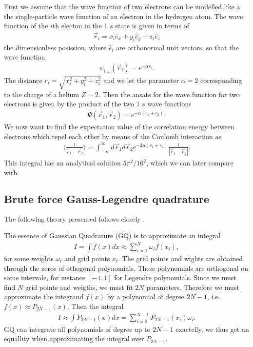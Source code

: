 \documentclass[twocolumn]{aastex62}
\begin{document}
First we assume that the wave function of two electrons can be modelled like a the single-particle wave function of an electron in the hydrogen atom. The wave function of the $i$th electon in the 1 $s$ state is given in terms of
\begin{align}
	\vec{r}_i = x_i \hat{e}_x + y_i\hat{e}_y + z_i\hat{e}_z
\end{align} 
the dimensionless posission, where $\hat{e}_i$ are orthonormal unit vectors, so that the wave function
\begin{align}
	\psi_{1,s}(\vec{r}_i) = e^{-\alpha r_i}.
\end{align}
The distance $r_i = \sqrt{x_i^2 + y_i^2 + z_i^2}$ and we let the parameter $\alpha = 2$ corresponding to the charge of a helium $Z = 2$. Then the ansats for the wave function for two electrons is given by the product of the two 1 $s$ wave functions 
\begin{align}
	\Psi(\vec{r}_1, \vec{r}_2) = e^{-\alpha(r_1 + r_2)}.
\end{align}
We now want to find the expectation value of the correlation energy between electrons which repel each other by means of the Coulomb interaction as 
\begin{align}
\langle \frac{
1}{\vec{r}_1 - \vec{r}_2}\rangle = \int^\infty_{-\infty} d\vec{r}_1d\vec{r}_2 e^{-2\alpha(r_1 + r_2)}\frac{1}{|\vec{r}_1 - \vec{r}_2|}.
\end{align}
This integral has an analytical solution $5\pi^2/16^2$, which we can later compare with.
\subsection{Brute force Gauss-Legendre quadrature}
The following theory presented follows closely \citep[Ch. 5.3]{jensen:2019}. 

The essence of Gaussian Quadrature (GQ) is to approximate an integral 
\begin{align}
	I = \int f(x) dx \approx \sum^N_{i = 1} \omega_i f(x_i),
\end{align} 
for some weights $\omega_i$ and grid points $x_i$. The grid points and wights are obtained through the zeros of othogonal polynomials. These polynomials are orthogonal on some intervale, for instance $[-1, 1]$ for Legendre polynomials. Since we must find $N$ grid points and weigths, we must fit $2N$ parameters. Therefore we must approximate the integrand $f(x)$ by a polynomial of degree $2N-1$, i.e. $f(x) \approx P_{2N-1}(x)$. Then the integral 
\begin{align}
	I \approx \int P_{2N-1}(x)dx = \sum^{N-1}_{i=0}P_{2N-1}(x_i) \omega_i.
\end{align} 
GQ can integrate all polynomials of degree up to $2N-1$ exactelly, we thus get an equallity when approximating the integral over $P_{2N-1}$. 
\end{document}
